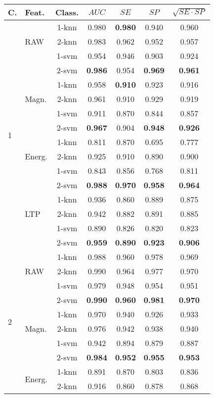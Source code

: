 \documentclass[twocolumn]{svjour3}          \smartqed  \usepackage[draft]{hyperref}
\begin{document}
\begin{table}[tb]
\scriptsize
\centering
\begin{tabular}{llccccc}
C.&	Feat.&Class.	&	$AUC$ &	$SE$ &	$SP$	&	$\sqrt{SE\cdot SP}$ \\
\hline \multirow{16}{*}{1}	&\multirow{3}{*}{RAW}	&1-knn&	0.980&	\bf{0.980}&	0.940&	0.960\\ 
&&2-knn&	0.983&	0.962&	0.952&	0.957\\ 
&&1-svm&	0.954&	0.946&	0.903&	0.924\\ 
&&2-svm&	\bf{0.986}&	0.954&	\bf{0.969}&	\bf{0.961}\\ 
[2pt] 
&\multirow{3}{*}{Magn.}	&1-knn&	0.958&	\bf{0.910}&	0.923&	0.916\\ 
&&2-knn&	0.961&	0.910&	0.929&	0.919\\ 
&&1-svm&	0.911&	0.870&	0.844&	0.857\\ 
&&2-svm&	\bf{0.967}&	0.904&	\bf{0.948}&	\bf{0.926}\\ 
[2pt] 
&\multirow{3}{*}{Energ.}	&1-knn&	0.811&	0.870&	0.695&	0.777\\ 
&&2-knn&	0.925&	0.910&	0.890&	0.900\\ 
&&1-svm&	0.843&	0.856&	0.768&	0.811\\ 
&&2-svm&\bf{0.988}&	\bf{0.970}&	\bf{0.958}&	\bf{0.964}\\ 
[2pt] 
&\multirow{3}{*}{LTP}	&1-knn&	0.936&	0.860&	0.889&	0.875\\ 
&&2-knn&	0.942&	0.882&	0.891&	0.885\\ 
&&1-svm&	0.890&	0.826&	0.820&	0.823\\ 
&&2-svm &\bf{0.959}&	\bf{0.890}&	\bf{0.923}&	\bf{0.906}\\ 
[2pt] 
\hline 
\multirow{16}{*}{2}	&\multirow{3}{*}{RAW}	&1-knn&	0.988&	0.960&	0.978&	0.969\\ 
&&2-knn&	0.990&	0.964&	0.977&	0.970\\ 
&&1-svm&	0.979&	0.948&	0.954&	0.951\\ 
&&2-svm&\bf{0.990}&	\bf{0.960}&	\bf{0.981}&	\bf{0.970}\\ 
[2pt] 
&\multirow{3}{*}{Magn.}	&1-knn&	0.970&	0.940&	0.926&	0.933\\ 
&&2-knn&	0.976&	0.942&	0.938&	0.940\\ 
&&1-svm&	0.942&	0.894&	0.879&	0.887\\ 
&&2-svm&	\bf{0.984}&	\bf{0.952}&	\bf{0.955}&	\bf{0.953}\\ 
[2pt] 
&\multirow{3}{*}{Energ.}	&1-knn&	0.891&	0.870&	0.803&	0.836\\ 
&&2-knn&	0.916&	0.860&	0.878&	0.868\\ 

\end{tabular}
\end{table}
\end{document}
